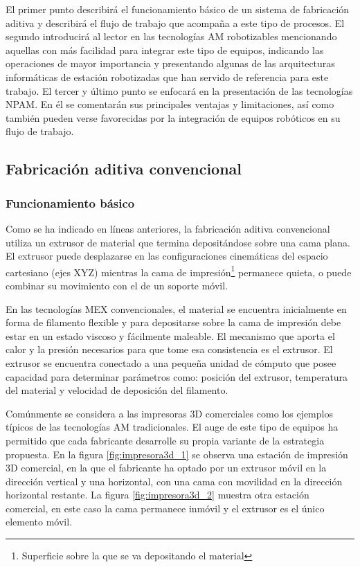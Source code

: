 El primer punto describirá el funcionamiento básico de un sistema de fabricación aditiva y describirá el flujo de trabajo que acompaña a este tipo de procesos. El segundo introducirá al lector en las tecnologías \acrshort{AM} robotizables mencionando aquellas con más facilidad para integrar este tipo de equipos, indicando las operaciones de mayor importancia y presentando algunas de las arquitecturas informáticas de estación robotizadas que han servido de referencia para este trabajo. El tercer y último punto se enfocará en la presentación de las tecnologías \acrshort{NPAM}. En él se comentarán sus principales ventajas y limitaciones, así como también pueden verse favorecidas por la integración de equipos robóticos en su flujo de trabajo.

\subsection{Fabricación aditiva convencional}
\subsubsection*{Funcionamiento básico}
\hypertarget{Funcionamiento básico}{}

Como se ha indicado en líneas anteriores, la fabricación aditiva convencional utiliza un extrusor de material que termina depositándose sobre una cama plana.  El extrusor puede desplazarse en las configuraciones cinemáticas del espacio cartesiano (ejes XYZ) mientras la cama de impresión\footnote{Superficie sobre la que se va depositando el material} permanece quieta, o puede combinar su movimiento con el de un soporte móvil.

En las tecnologías \acrshort{MEX} convencionales, el material se encuentra inicialmente en forma de filamento flexible y para depositarse sobre la cama de impresión debe estar en un estado viscoso y fácilmente maleable. El mecanismo que aporta el calor y la presión necesarios para que tome esa consistencia es el extrusor. El extrusor se encuentra conectado a una pequeña unidad de cómputo que posee capacidad para determinar parámetros como: posición del extrusor, temperatura del material y velocidad de deposición del filamento.

Comúnmente se considera a las impresoras 3D comerciales como los ejemplos típicos de las tecnologías \acrshort{AM} tradicionales. El auge de este tipo de equipos ha permitido que cada fabricante desarrolle su propia variante de la estrategia propuesta. En la figura \ref{fig:impresora3d_1} se observa una estación de impresión 3D comercial, en la que el fabricante ha optado por un extrusor móvil en la dirección vertical y una horizontal, con una cama con movilidad en la dirección horizontal restante. La figura \ref{fig:impresora3d_2} muestra otra estación comercial, en este caso la cama permanece inmóvil y el extrusor es el único elemento móvil.

